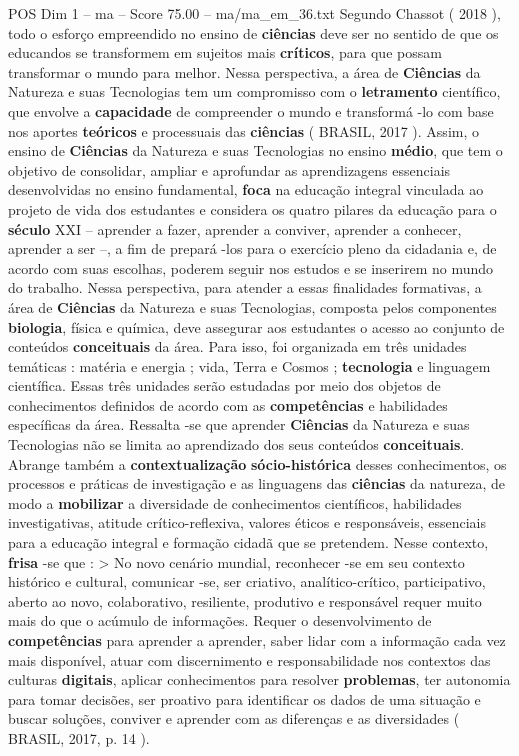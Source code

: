 \begin{textsample}{POS Dim 1 – ma – Score 75.00 – ma/ma\_em\_36.txt}
Segundo Chassot ( 2018 ), todo o esforço empreendido no ensino de \textbf{ciências} deve ser no sentido de que os educandos se transformem em sujeitos mais \textbf{críticos}, para que possam transformar o mundo para melhor.
Nessa perspectiva, a área de \textbf{Ciências} da Natureza e suas Tecnologias tem um compromisso com o \textbf{letramento} científico, que envolve a \textbf{capacidade} de compreender o mundo e transformá -lo com base nos aportes \textbf{teóricos} e processuais das \textbf{ciências} ( BRASIL, 2017 ).
Assim, o ensino de \textbf{Ciências} da Natureza e suas Tecnologias no ensino \textbf{médio}, que tem o objetivo de consolidar, ampliar e aprofundar as aprendizagens essenciais desenvolvidas no ensino fundamental, \textbf{foca} na educação integral vinculada ao projeto de vida dos estudantes e considera os quatro pilares da educação para o \textbf{século} XXI – aprender a fazer, aprender a conviver, aprender a conhecer, aprender a ser –, a fim de prepará -los para o exercício pleno da cidadania e, de acordo com suas escolhas, poderem seguir nos estudos e se inserirem no mundo do trabalho.
Nessa perspectiva, para atender a essas finalidades formativas, a área de \textbf{Ciências} da Natureza e suas Tecnologias, composta pelos componentes \textbf{biologia}, física e química, deve assegurar aos estudantes o acesso ao conjunto de conteúdos \textbf{conceituais} da área.
Para isso, foi organizada em três unidades temáticas : matéria e energia ; vida, Terra e Cosmos ; \textbf{tecnologia} e linguagem científica.
Essas três unidades serão estudadas por meio dos objetos de conhecimentos definidos de acordo com as \textbf{competências} e habilidades específicas da área.
Ressalta -se que aprender \textbf{Ciências} da Natureza e suas Tecnologias não se limita ao aprendizado dos seus conteúdos \textbf{conceituais}.
Abrange também a \textbf{contextualização} \textbf{sócio-histórica} desses conhecimentos, os processos e práticas de investigação e as linguagens das \textbf{ciências} da natureza, de modo a \textbf{mobilizar} a diversidade de conhecimentos científicos, habilidades investigativas, atitude crítico-reflexiva, valores éticos e responsáveis, essenciais para a educação integral e formação cidadã que se pretendem.
Nesse contexto, \textbf{frisa} -se que : > No novo cenário mundial, reconhecer -se em seu contexto histórico e cultural, comunicar -se, ser criativo, analítico-crítico, participativo, aberto ao novo, colaborativo, resiliente, produtivo e responsável requer muito mais do que o acúmulo de informações.
Requer o desenvolvimento de \textbf{competências} para aprender a aprender, saber lidar com a informação cada vez mais disponível, atuar com discernimento e responsabilidade nos contextos das culturas \textbf{digitais}, aplicar conhecimentos para resolver \textbf{problemas}, ter autonomia para tomar decisões, ser proativo para identificar os dados de uma situação e buscar soluções, conviver e aprender com as diferenças e as diversidades ( BRASIL, 2017, p. 14 ).

\end{textsample}
